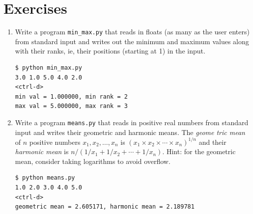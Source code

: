 \documentclass[8pt,a4paper,compress]{beamer}
\begin{document}
\section{Exercises}
\begin{frame}[fragile]
\begin{enumerate}
\item Write a program \lstinline{min_max.py} that reads in floats (as many as the user enters) from standard input and writes out the minimum and maximum values along with their ranks, ie, their positions (starting at 1) in the input.

\begin{lstlisting}[language={}]
$ python min_max.py
3.0 1.0 5.0 4.0 2.0
<ctrl-d>
min val = 1.000000, min rank = 2
max val = 5.000000, max rank = 3
\end{lstlisting}

\item Write a program  \lstinline{means.py} that reads in positive real numbers from standard input and writes their geometric and harmonic means. The \emph{geome
tric mean} of $n$ positive numbers $x_1, x_2, \dots, x_n$ is $(x_1 \times x_2 \times \cdots \times x_n)^{1/n}$ and their \emph{harmonic mean} is $n / (1/x_1 + 1/x_2 + \cdots + 1/x_n)$. Hint: for the geometric mean, consider taking logarithms to avoid overflow.

\begin{lstlisting}[language={}]
$ python means.py
1.0 2.0 3.0 4.0 5.0
<ctrl-d>
geometric mean = 2.605171, harmonic mean = 2.189781
\end{lstlisting}
\end{enumerate}
\end{frame}
\end{document}
